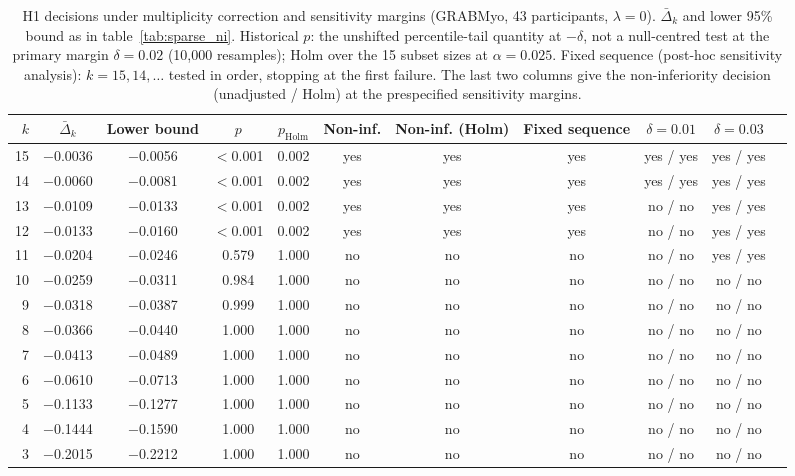 \begin{table}[htbp]
\centering
\small
\caption{H1 decisions under multiplicity correction and sensitivity margins (GRABMyo, 43 participants, $\lambda = 0$). $\bar\Delta_k$ and lower 95\% bound as in table~\ref{tab:sparse_ni}. Historical $p$: the unshifted percentile-tail quantity at $-\delta$, not a null-centred test at the primary margin $\delta = 0.02$ (10,000 resamples); Holm over the 15 subset sizes at $\alpha = 0.025$. Fixed sequence (post-hoc sensitivity analysis): $k = 15, 14, \ldots$ tested in order, stopping at the first failure. The last two columns give the non-inferiority decision (unadjusted / Holm) at the prespecified sensitivity margins.}
\label{tab:h1_holm}
\setlength{\tabcolsep}{4pt}
\begin{adjustbox}{max width=\textwidth}
\begin{tabular}{rcccccccccc}
\toprule
$k$ & $\bar\Delta_k$ & Lower bound & $p$ & $p_{\mathrm{Holm}}$ & Non-inf. & Non-inf. (Holm) & Fixed sequence & $\delta = 0.01$ & $\delta = 0.03$ \\
\midrule
15 & $-$0.0036 & $-$0.0056 & $<$0.001 & 0.002 & yes & yes & yes & yes / yes & yes / yes \\
14 & $-$0.0060 & $-$0.0081 & $<$0.001 & 0.002 & yes & yes & yes & yes / yes & yes / yes \\
13 & $-$0.0109 & $-$0.0133 & $<$0.001 & 0.002 & yes & yes & yes & no / no & yes / yes \\
12 & $-$0.0133 & $-$0.0160 & $<$0.001 & 0.002 & yes & yes & yes & no / no & yes / yes \\
11 & $-$0.0204 & $-$0.0246 & 0.579 & 1.000 & no & no & no & no / no & yes / yes \\
10 & $-$0.0259 & $-$0.0311 & 0.984 & 1.000 & no & no & no & no / no & no / no \\
9 & $-$0.0318 & $-$0.0387 & 0.999 & 1.000 & no & no & no & no / no & no / no \\
8 & $-$0.0366 & $-$0.0440 & 1.000 & 1.000 & no & no & no & no / no & no / no \\
7 & $-$0.0413 & $-$0.0489 & 1.000 & 1.000 & no & no & no & no / no & no / no \\
6 & $-$0.0610 & $-$0.0713 & 1.000 & 1.000 & no & no & no & no / no & no / no \\
5 & $-$0.1133 & $-$0.1277 & 1.000 & 1.000 & no & no & no & no / no & no / no \\
4 & $-$0.1444 & $-$0.1590 & 1.000 & 1.000 & no & no & no & no / no & no / no \\
3 & $-$0.2015 & $-$0.2212 & 1.000 & 1.000 & no & no & no & no / no & no / no \\

\end{tabular}
\end{adjustbox}
\end{table}
